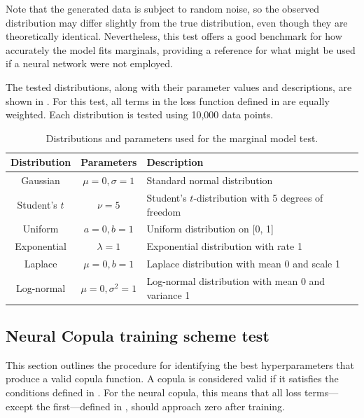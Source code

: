 Note that the generated data is subject to random noise, so the observed distribution may differ slightly from the true distribution, even though they are theoretically identical. Nevertheless, this test offers a good benchmark for how accurately the model fits marginals, providing a reference for what might be used if a neural network were not employed.

The tested distributions, along with their parameter values and descriptions, are shown in . For this test, all terms in the loss function defined in  are equally weighted. Each distribution is tested using 10,000 data points.

\begin{table}[h]
    \centering
    \caption{Distributions and parameters used for the marginal model test.}
    \begin{tabular}{@{}ccl@{}}
        Distribution & Parameters & Description \\
        \toprule
        Gaussian & $\mu=0, \sigma=1$ & Standard normal distribution \\ 
        Student's $t$ & $\nu=5$ & Student's $t$-distribution with 5 degrees of freedom \\ 
        Uniform & $a=0, b=1$ & Uniform distribution on [0, 1] \\ 
        Exponential & $\lambda=1$ & Exponential distribution with rate 1 \\ 
        Laplace & $\mu=0, b=1$ & Laplace distribution with mean 0 and scale 1 \\ 
        Log-normal & $\mu=0, \sigma^2=1$ & Log-normal distribution with mean 0 and variance 1 \\ 
    \end{tabular}
    \label{tab:distributions}
\end{table}


\subsection{Neural Copula training scheme test}
This section outlines the procedure for identifying the best hyperparameters that produce a valid copula function. A copula is considered valid if it satisfies the conditions defined in . For the neural copula, this means that all loss terms—except the first—defined in , should approach zero after training.

